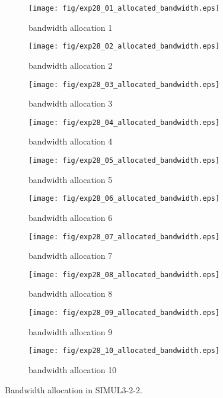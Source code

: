 	\begin{figure}
		\begin{center}
			\begin{subfigure}[b]{0.32\textwidth}
				\texttt{[image: fig/exp28\_01\_allocated\_bandwidth.eps]}
				\caption{bandwidth allocation 1}
				\label{figure:simul3_2_2_b_a}
			\end{subfigure}
			\begin{subfigure}[b]{0.32\textwidth}
				\texttt{[image: fig/exp28\_02\_allocated\_bandwidth.eps]}
				\caption{bandwidth allocation 2}
				\label{figure:simul3_2_2_b_b}
			\end{subfigure}
			\begin{subfigure}[b]{0.32\textwidth}
				\texttt{[image: fig/exp28\_03\_allocated\_bandwidth.eps]}
				\caption{bandwidth allocation 3}
				\label{figure:simul3_2_2_b_c}
			\end{subfigure}
			\begin{subfigure}[b]{0.32\textwidth}
				\texttt{[image: fig/exp28\_04\_allocated\_bandwidth.eps]}
				\caption{bandwidth allocation 4}
				\label{figure:simul3_2_2_b_d}
			\end{subfigure}
			\begin{subfigure}[b]{0.32\textwidth}
				\texttt{[image: fig/exp28\_05\_allocated\_bandwidth.eps]}
				\caption{bandwidth allocation 5}
				\label{figure:simul3_2_2_b_e}
			\end{subfigure}
			\begin{subfigure}[b]{0.32\textwidth}
				\texttt{[image: fig/exp28\_06\_allocated\_bandwidth.eps]}
				\caption{bandwidth allocation 6}
				\label{figure:simul3_2_2_b_f}
			\end{subfigure}
			\begin{subfigure}[b]{0.32\textwidth}
				\texttt{[image: fig/exp28\_07\_allocated\_bandwidth.eps]}
				\caption{bandwidth allocation 7}
				\label{figure:simul3_2_2_b_g}
			\end{subfigure}
			\begin{subfigure}[b]{0.32\textwidth}
				\texttt{[image: fig/exp28\_08\_allocated\_bandwidth.eps]}
				\caption{bandwidth allocation 8}
				\label{figure:simul3_2_2_b_h}
			\end{subfigure}
			\begin{subfigure}[b]{0.32\textwidth}
				\texttt{[image: fig/exp28\_09\_allocated\_bandwidth.eps]}
				\caption{bandwidth allocation 9}
				\label{figure:simul3_2_2_b_i}
			\end{subfigure}
			\begin{subfigure}[b]{0.32\textwidth}
				\texttt{[image: fig/exp28\_10\_allocated\_bandwidth.eps]}
				\caption{bandwidth allocation 10}
				\label{figure:simul3_2_2_b_j}
			\end{subfigure}
			\caption{Bandwidth allocation in SIMUL3-2-2.}
			\label{figure:simul3_2_2_ba}
		\end{center}
	\end{figure}


